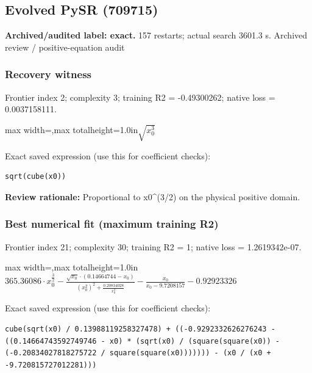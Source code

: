 \documentclass[10pt,letterpaper,landscape]{article}
\begin{document}
\begin{minipage}[t]{0.485\textwidth}
\subsection*{Evolved PySR (709715)}
\textbf{Archived/audited label: exact.} 157 restarts; actual search 3601.3 s.
{\small Archived review / positive-equation audit}
\subsubsection*{Recovery witness}
Frontier index 2; complexity 3; training R2 = -0.49300262; native loss = 0.0037158111.
\begin{center}\begin{adjustbox}{max width=\linewidth,max totalheight=1.0in}$\displaystyle \sqrt{x_{0}^{3}}$\end{adjustbox}\end{center}
{\scriptsize Exact saved expression (use this for coefficient checks):}
\begin{lstlisting}
sqrt(cube(x0))
\end{lstlisting}
{\small\textbf{Review rationale:} Proportional to x0\textasciicircum{}(3/2) on the physical positive domain.}
\subsubsection*{Best numerical fit (maximum training R2)}
Frontier index 21; complexity 30; training R2 = 1; native loss = 1.2619342e-07.
\begin{center}\begin{adjustbox}{max width=\linewidth,max totalheight=1.0in}$\displaystyle 365.36086 \cdot x_{0}^{\frac{3}{2}} - \frac{\sqrt{x_{0}} \cdot \left(0.14664744 - x_{0}\right)}{\left(x_{0}^{2}\right)^{2} + \frac{0.20834028}{x_{0}^{4}}} - \frac{x_{0}}{x_{0} - 9.7208157} - 0.92923326$\end{adjustbox}\end{center}
{\scriptsize Exact saved expression (use this for coefficient checks):}
\begin{lstlisting}
cube(sqrt(x0) / 0.13988119258327478) + ((-0.9292332626276243 - ((0.14664743592749746 - x0) * (sqrt(x0) / (square(square(x0)) - (-0.20834027818275722 / square(square(x0))))))) - (x0 / (x0 + -9.720815727012281)))
\end{lstlisting}
\end{minipage}
\clearpage{}\label{kepler-10007}
\end{document}
